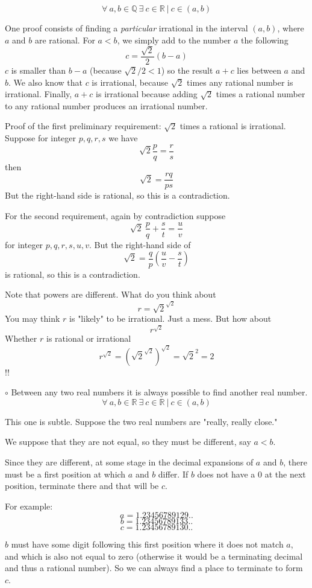 \documentclass[11pt, oneside]{article}   	%
\begin{document}
\[ \forall \ a,b \in \mathbb{Q} \ \exists \ c \in \mathbb{R} \ | \ c \in (a,b) \]

One proof consists of finding a \emph{particular} irrational in the interval $(a,b)$, where $a$ and $b$ are rational.  For $a < b$, we simply add to the number $a$ the following
\[ c = \frac{\sqrt{2}}{2}(b - a) \]
$c$ is smaller than $b - a$ (because $\sqrt{2}/2 < 1$) so the result $a + c$ lies between $a$ and $b$.  We also know that $c$ is irrational, because $\sqrt{2}$ times any rational number is irrational.  Finally, $a + c$ is irrational because adding $\sqrt{2}$ times a rational number to any rational number produces an irrational number.

Proof of the first preliminary requirement:  $\sqrt{2}$ times a rational is irrational.  Suppose for integer $p, q, r, s$ we have
\[ \sqrt{2} \frac{p}{q} = \frac{r}{s} \]
then
\[ \sqrt{2} = \frac{rq}{ps} \]
But the right-hand side is rational, so this is a contradiction.

For the second requirement, again by contradiction suppose
\[ \sqrt{2} \ \frac{p}{q} +  \frac{s}{t} = \frac{u}{v} \]
for integer $p, q, r, s, u, v$.  But the right-hand side of
\[ \sqrt{2} = \frac{q}{p} ( \frac{u}{v} - \frac{s}{t}) \]
is rational, so this is a contradiction.

Note that powers are different.  What do you think about
\[ r = \sqrt{2}^{\sqrt{2}} \]
You may think $r$ is "likely" to be irrational.  Just a mess.  But how about
\[ r^{\sqrt{2}} \]
Whether $r$ is rational or irrational
\[ r^{\sqrt{2}} = (\sqrt{2}^{\sqrt{2}})^{\sqrt{2}} = \sqrt{2}^2 = 2 \]
!!

$\circ$  Between any two real numbers it is always possible to find another real number.  
\[ \forall \ a,b \in \mathbb{R} \ \exists \ c \in \mathbb{R} \ | \ c \in (a,b) \]

This one is subtle.  Suppose the two real numbers are "really, really close."  

We suppose that they are not equal, so they must be different, say $a < b$.

Since they are different, at some stage in the decimal expansions of $a$ and $b$, there must be a first position at which $a$ and $b$ differ.  If $b$ does not have a $0$ at the next position, terminate there and that will be $c$.

For example:
\[ a = 1.23456789129.. \]
\[ b = 1.23456789133.. \]
\[ c = 1.23456789130.. \]

$b$ must have some digit following this first position where it does not match $a$, and which is also not equal to zero (otherwise it would be a terminating decimal and thus a rational number).  So we can always find a place to terminate to form $c$.
\end{document}
